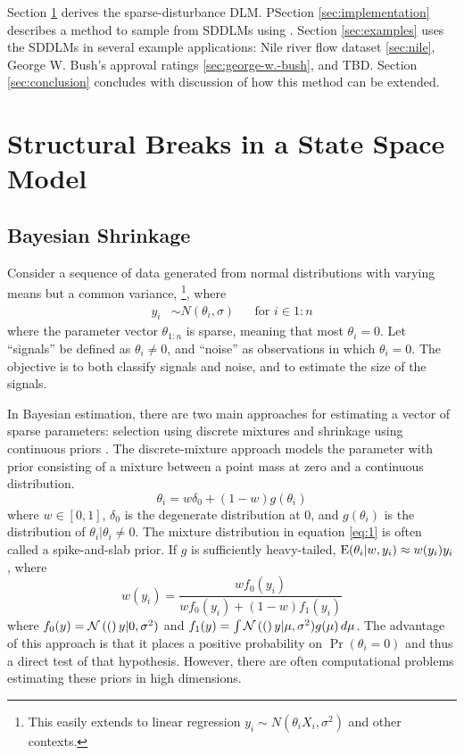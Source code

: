 \documentclass{article}
\begin{document}
Section \ref{sec:struct-breaks-state} derives the sparse-disturbance DLM.
PSection \ref{sec:implementation} describes a method to sample from SDDLMs using \Stan{}.
Section \ref{sec:examples} uses the SDDLMs in several example applications: Nile river flow dataset \ref{sec:nile}, George W. Bush's approval ratings \ref{sec:george-w.-bush}, and TBD.
Section \ref{sec:conclusion} concludes with discussion of how this
method can be extended.

\section{Structural Breaks in a State Space Model}
\label{sec:struct-breaks-state}

\subsection{Bayesian Shrinkage}
\label{sec:bayesian-shrinkage}

Consider a sequence of data generated from normal distributions with varying means but a common variance,%
\footnote{This easily extends to linear regression $y_{i} \sim N(\theta_{i} X_{i}, \sigma^{2})$ and other contexts.}, where
\begin{align}
  \label{eq:13}
  y_{i} & \sim N(\theta_{i}, \sigma) & & \text{for $i \in 1:n$}
\end{align}
where the parameter vector $\theta_{1:n}$ is sparse, meaning that most $\theta_{i} = 0$.
Let ``signals'' be defined as $\theta_{i} \neq 0$, and ``noise'' as observations in which $\theta_{i} = 0$.
The objective is to both classify signals and noise, and to estimate the size of the signals.

In Bayesian estimation, there are two main approaches for estimating a vector of sparse parameters: selection using discrete mixtures and shrinkage using continuous priors \parencite[73]{CarvalhoPolsonScott2009}. 
The discrete-mixture approach models the parameter with prior consisting of a mixture between a point mass at zero and a continuous distribution.
\begin{equation}
  \label{eq:1}
  \theta_{i} = w \delta_{0} +  (1 - w) g(\theta_{i})
\end{equation}
where $w \in [0, 1]$, $\delta_{0}$ is the degenerate distribution at 0, and $g(\theta_{i})$ is the distribution of $\theta_{i} | \theta_{i} \neq 0$.
The mixture distribution in equation \eqref{eq:1} is often called a spike-and-slab prior.
If $g$ is sufficiently heavy-tailed, $\operatorname{E}(\theta_{i} | w, y_{i}) \approx w(y_{i}) y_{i}$ \textcite{PolsonScott2010}, where 
\begin{equation}
  \label{eq:7}
  w(y_{i})  = \frac{w f_{0}(y_{i})}{w f_{0}(y_{i}) + (1 - w) f_{1}(y_{i})}
\end{equation}
where $f_{0}(y) = \mathcal{N}\left((\right)y | 0, \sigma^{2})$ and $f_{1}(y) = \int \mathcal{N}\left((\right)y | \mu, \sigma^{2}) g(\mu) \,d \mu$.
The advantage of this approach is that it places a positive probability on $\Pr(\theta_{i} = 0)$ and thus a direct test of that hypothesis.
However, there are often computational problems estimating these priors in high dimensions.
\end{document}
